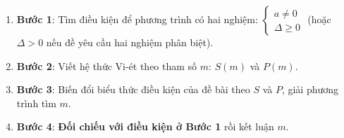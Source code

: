 \begin{enumerate}
\item \textbf{Bước 1}: Tìm điều kiện để phương trình có hai nghiệm: $\boxed{\begin{cases} a \ne 0 \\ \Delta \ge 0 \end{cases}}$ (hoặc $\Delta > 0$ nếu đề yêu cầu hai nghiệm phân biệt).
\item \textbf{Bước 2}: Viết hệ thức Vi-ét theo tham số $m$: $S(m)$ và $P(m)$.
\item \textbf{Bước 3}: Biến đổi biểu thức điều kiện của đề bài theo $S$ và $P$, giải phương trình tìm $m$.
\item \textbf{Bước 4}: \textbf{Đối chiếu với điều kiện ở Bước 1} rồi kết luận $m$.
\end{enumerate}

